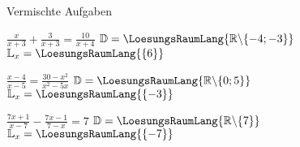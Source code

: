 \platzFuerBerechnungenBisEndeSeite{}




Vermischte Aufgaben


\begin{bbwAufgabenBlock}
\item $\frac{x}{x+3} + \frac{3}{x+3} = \frac{10}{x+4}$ \hspace{10mm}
$\mathbb{D}= \LoesungsRaumLang{\mathbb{R}\backslash\{-4;-3\}}$
$\mathbb{L}_x = \LoesungsRaumLang{\{  6  \}}$
\item $\frac{x-4}{x-5}  = \frac{30-x^2}{x^2-5x}$ \hspace{10mm}
$\mathbb{D}= \LoesungsRaumLang{\mathbb{R}\backslash\{0;5 \}}$
$\mathbb{L}_x = \LoesungsRaumLang{\{  -3  \}}$
\item $\frac{7x+1}{x-7}   - \frac{7x-1}{7-x} = 7$ \hspace{10mm}
$\mathbb{D}= \LoesungsRaumLang{\mathbb{R}\backslash\{7 \}}$
$\mathbb{L}_x = \LoesungsRaumLang{\{  -7  \}}$

\end{bbwAufgabenBlock}

\platzFuerBerechnungenBisEndeSeite{}




